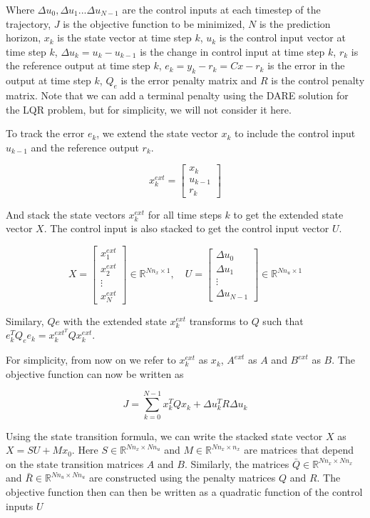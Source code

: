 \documentclass{article}
\begin{document}
Where $\Delta u_0, \Delta u_1 ... \Delta u_{N-1}$ are the control inputs at each timestep of the trajectory,
$J$ is the objective function to be minimized, $N$ is the prediction horizon, $x_k$ is the state vector at time step $k$,
$u_k$ is the control input vector at time step $k$, $\Delta u_k = u_k - u_{k-1}$ is the change in control input at time step $k$,
$r_k$ is the reference output at time step $k$, $e_k = y_k - r_k = Cx - r_k$ is the error in the output at time step $k$,
$Q_e$ is the error penalty matrix and $R$ is the control penalty matrix.
Note that we can add a terminal penalty using the DARE solution for the LQR problem, but for simplicity, we will not consider it here.

To track the error $e_k$, we extend the state vector $x_k$ to include the control input $u_{k-1}$ and the reference output $r_k$.

$$
x_k^{ext} =
\begin{bmatrix}
  x_k \\
  u_{k-1} \\
  r_k
\end{bmatrix}
$$

And stack the state vectors $x_k^{ext}$ for all time steps $k$ to get the extended state vector $X$.
The control input is also stacked to get the control input vector $U$.

$$
X =
\begin{bmatrix}
  x_1^{ext} \\
  x_2^{ext} \\
  \vdots \\
  x_N^{ext}
\end{bmatrix}  \in \mathbb{R}^{Nn_x \times 1}, \quad
U =
\begin{bmatrix}
  \Delta u_0 \\
  \Delta u_1 \\
  \vdots \\
  \Delta u_{N-1}
\end{bmatrix}  \in \mathbb{R}^{Nn_u \times 1}
$$

Similary, $Qe$ with the extended state $x_k^{ext}$ transforms to $Q$ such that $e_k^T Q_e e_k = x_k^{ext^T} Q x_k^{ext}$.

For simplicity, from now on we refer to $x_k^{ext}$ as $x_k$, $A^{ext}$ as $A$ and $B^{ext}$ as $B$.
The objective function can now be written as

$$
J = \sum_{k=0}^{N-1} x_k^T Q x_k + \Delta u_k^T R \Delta u_k
$$

Using the state transition formula, we can write the stacked state vector $X$ as $X = SU + Mx_0$.
Here $S \in \mathbb{R}^{Nn_x \times Nn_u}$ and $M \in \mathbb{R}^{Nn_x \times n_x}$ are matrices that depend on the
state transition matrices $A$ and $B$.
Similarly, the matrices $\bar{Q} \in \mathbb{R}^{Nn_x \times Nn_x}$ and $\bar{R} \in \mathbb{R}^{Nn_u \times Nn_u}$
are constructed using the penalty matrices $Q$ and $R$. The objective function then can then be written as a quadratic function of the control inputs $U$
\end{document}
